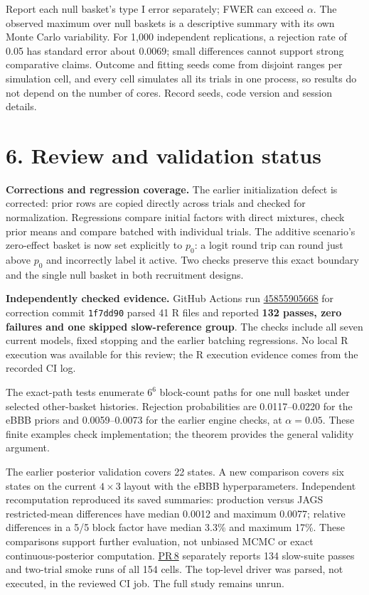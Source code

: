 \documentclass[10pt,a4paper]{article}
\begin{document}
Report each null basket's type I error separately; FWER can exceed $\alpha$.
The observed maximum over null baskets is a descriptive summary with its own
Monte Carlo variability. For 1,000 independent replications, a rejection rate
of 0.05 has standard error about $0.0069$; small differences cannot support
strong comparative claims. Outcome and fitting seeds come from disjoint
ranges per simulation cell, and every cell simulates all its trials in one
process, so results do not depend on the number of cores. Record seeds,
code version and session details.

\section*{6. Review and validation status}
\textbf{Corrections and regression coverage.}
The earlier initialization defect is corrected: prior rows are copied directly
across trials and checked for normalization. Regressions compare initial
factors with direct mixtures, check prior means and compare batched with
individual trials. The additive scenario's zero-effect basket is now set
explicitly to $p_0$: a logit round trip can round just above $p_0$ and
incorrectly label it active. Two checks preserve this exact boundary and the
single null basket in both recruitment designs.

\textbf{Independently checked evidence.}
GitHub Actions run \href{https://github.com/HenkvdPol/E-BBB-3/actions/runs/45855905668}{45855905668}
for correction commit \texttt{1f7dd90} parsed 41 R files and reported
\textbf{132 passes, zero failures and one skipped slow-reference group}.
The checks include all seven current models, fixed stopping and the earlier
batching regressions. No local R execution was available for this review;
the R execution evidence comes from the recorded CI log.

The exact-path tests enumerate $6^6$ block-count paths for one null basket
under selected other-basket histories. Rejection probabilities are
0.0117--0.0220 for the eBBB priors and 0.0059--0.0073 for the earlier engine
checks, at $\alpha=0.05$. These finite examples check implementation;
the theorem provides the general validity argument.

The earlier posterior validation covers 22 states. A new comparison covers
six states on the current $4\times3$ layout with the eBBB hyperparameters.
Independent recomputation reproduced its saved summaries: production versus
JAGS restricted-mean differences have median 0.0012 and maximum 0.0077;
relative differences in a 5/5 block factor have median 3.3\% and maximum 17\%.
These comparisons support further evaluation, not unbiased MCMC or exact
continuous-posterior computation. \href{https://github.com/HenkvdPol/E-BBB-3/pull/8}{PR\,8} separately reports 134 slow-suite
passes and two-trial smoke runs of all 154 cells. The top-level driver was
parsed, not executed, in the reviewed CI job. The full study remains unrun.
\end{document}
